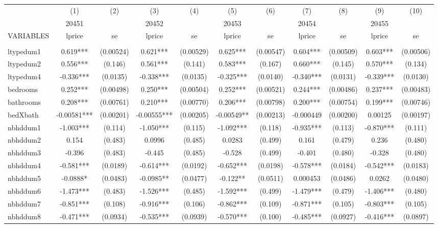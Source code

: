 \documentclass[]{article}
\begin{document}
\begin{tabular}{lcccccccccc} \hline
 & (1) & (2) & (3) & (4) & (5) & (6) & (7) & (8) & (9) & (10) \\
 & 20451 &  & 20452 &  & 20453 &  & 20454 &  & 20455 &  \\
VARIABLES & lprice & se & lprice & se & lprice & se & lprice & se & lprice & se \\ \hline
 &  &  &  &  &  &  &  &  &  &  \\
ltypedum1 & 0.619*** & (0.00524) & 0.621*** & (0.00529) & 0.625*** & (0.00547) & 0.604*** & (0.00509) & 0.603*** & (0.00506) \\
ltypedum2 & 0.556*** & (0.146) & 0.561*** & (0.141) & 0.583*** & (0.167) & 0.660*** & (0.145) & 0.570*** & (0.134) \\
ltypedum4 & -0.336*** & (0.0135) & -0.338*** & (0.0135) & -0.325*** & (0.0140) & -0.340*** & (0.0131) & -0.339*** & (0.0130) \\
bedrooms & 0.252*** & (0.00498) & 0.250*** & (0.00504) & 0.252*** & (0.00521) & 0.244*** & (0.00486) & 0.237*** & (0.00483) \\
bathrooms & 0.208*** & (0.00761) & 0.210*** & (0.00770) & 0.206*** & (0.00798) & 0.200*** & (0.00754) & 0.199*** & (0.00746) \\
bedXbath & -0.00581*** & (0.00201) & -0.00555*** & (0.00205) & -0.00549** & (0.00213) & -0.000449 & (0.00200) & 0.00125 & (0.00197) \\
nbhddum1 & -1.003*** & (0.114) & -1.050*** & (0.115) & -1.092*** & (0.118) & -0.935*** & (0.113) & -0.870*** & (0.111) \\
nbhddum2 & 0.154 & (0.483) & 0.0996 & (0.485) & 0.0283 & (0.499) & 0.161 & (0.479) & 0.236 & (0.480) \\
nbhddum3 & -0.396 & (0.483) & -0.445 & (0.485) & -0.528 & (0.499) & -0.401 & (0.480) & -0.328 & (0.480) \\
nbhddum4 & -0.581*** & (0.0189) & -0.614*** & (0.0192) & -0.652*** & (0.0198) & -0.578*** & (0.0184) & -0.542*** & (0.0183) \\
nbhddum5 & -0.0888* & (0.0483) & -0.0985** & (0.0477) & -0.122** & (0.0511) & 0.000453 & (0.0486) & 0.0262 & (0.0480) \\
nbhddum6 & -1.473*** & (0.483) & -1.526*** & (0.485) & -1.592*** & (0.499) & -1.479*** & (0.479) & -1.406*** & (0.480) \\
nbhddum7 & -0.851*** & (0.108) & -0.916*** & (0.106) & -0.862*** & (0.109) & -0.871*** & (0.105) & -0.803*** & (0.105) \\
nbhddum8 & -0.471*** & (0.0934) & -0.535*** & (0.0939) & -0.570*** & (0.100) & -0.485*** & (0.0927) & -0.416*** & (0.0897) \\

\end{tabular}
\end{document}
